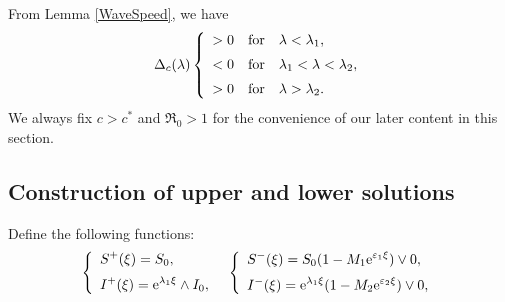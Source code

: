 \documentclass[final,3p,times]{elsarticle}
\numberwithin{equation}{section}
\begin{document}
From Lemma \ref{WaveSpeed}, we have
\begin{equation}
\label{WaveSpeedRel}
\Delta_c(\lambda)\left\{
\begin{array}{l}
\vspace{2mm}
\displaystyle   >0\ \ \ {\rm for}\ \ \ \lambda<\lambda_1,\\
\vspace{2mm}
\displaystyle   <0\ \ \ {\rm for}\ \ \ \lambda_1<\lambda<\lambda_2,\\
\displaystyle   >0\ \ \ {\rm for}\ \ \ \lambda>\lambda_2.
\end{array}\right.
\end{equation}
We always fix $c>c^*$ and $\Re_0>1$ for the convenience of our later content in this section.
\subsection{Construction of upper and lower solutions}
Define the following functions:
\begin{equation}
\label{UpLowSolution}\left\{
\begin{array}{l}
\vspace{2mm}
\displaystyle   S^+(\xi)=S_0,\\
\displaystyle   I^+(\xi) = \mathrm{e}^{\lambda_1 \xi}\wedge I_0,
\end{array}\right.
\ \
\left\{
\begin{array}{l}
\vspace{2mm}
\displaystyle   S^-(\xi)=S_0(1-M_1 \mathrm{e}^{\varepsilon_1 \xi})\vee 0,\\
\displaystyle   I^-(\xi)=\mathrm{e}^{\lambda_1\xi}(1-M_2\mathrm{e}^{\varepsilon_2 \xi})\vee 0,
\end{array}\right.
\end{equation}
\end{document}
